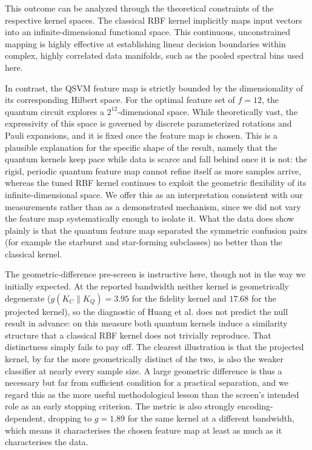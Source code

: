 This outcome can be analyzed through the theoretical constraints of the respective kernel spaces. The classical RBF kernel implicitly maps input vectors into an infinite-dimensional functional space. This continuous, unconstrained mapping is highly effective at establishing linear decision boundaries within complex, highly correlated data manifolds, such as the pooled spectral bins used here.

In contrast, the QSVM feature map is strictly bounded by the dimensionality of its corresponding Hilbert space. For the optimal feature set of $f=12$, the quantum circuit explores a $2^{12}$-dimensional space. While theoretically vast, the expressivity of this space is governed by discrete parameterized rotations and Pauli expansions, and it is fixed once the feature map is chosen. This is a plausible explanation for the specific shape of the result, namely that the quantum kernels keep pace while data is scarce and fall behind once it is not: the rigid, periodic quantum feature map cannot refine itself as more samples arrive, whereas the tuned RBF kernel continues to exploit the geometric flexibility of its infinite-dimensional space. We offer this as an interpretation consistent with our measurements rather than as a demonstrated mechanism, since we did not vary the feature map systematically enough to isolate it. What the data does show plainly is that the quantum feature map separated the symmetric confusion pairs (for example the starburst and star-forming subclasses) no better than the classical kernel.

The geometric-difference pre-screen is instructive here, though not in the way we initially
expected. At the reported bandwidth neither kernel is geometrically degenerate
($g(K_C \| K_Q) = 3.95$ for the fidelity kernel and $17.68$ for the projected kernel), so
the diagnostic of Huang et al. \cite{huang2021power} does not predict the null result in
advance: on this measure both quantum kernels induce a similarity structure that a
classical RBF kernel does not trivially reproduce. That distinctness simply fails to pay
off. The clearest illustration is that the projected kernel, by far the more geometrically
distinct of the two, is also the weaker classifier at nearly every sample size. A large
geometric difference is thus a necessary but far from sufficient condition for a practical
separation, and we regard this as the more useful methodological lesson than the screen's
intended role as an early stopping criterion. The metric is also strongly
encoding-dependent, dropping to $g = 1.89$ for the same kernel at a different bandwidth,
which means it characterises the chosen feature map at least as much as it characterises
the data.

